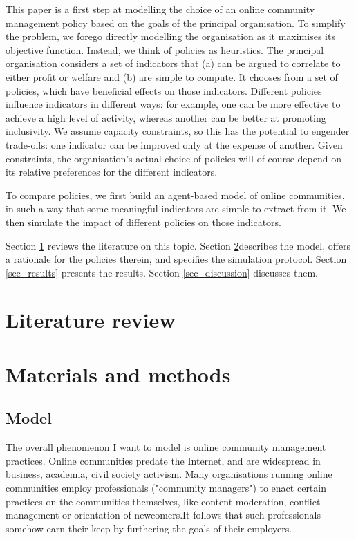 \documentclass{article}
\begin{document}

This paper is a first step at modelling the choice of an online community management policy based on the goals of the principal organisation. To simplify the problem, we forego directly modelling the organisation as it maximises its objective function. Instead, we think of policies as heuristics. The principal organisation considers a set of indicators that (a) can be argued to correlate to either profit or welfare and (b) are simple to compute. It chooses from a set of policies, which have beneficial effects on those indicators. Different policies influence indicators in different ways: for example, one can be more effective to achieve a high level of activity, whereas another can be better at promoting inclusivity. We assume capacity constraints, so this has the potential to engender trade-offs: one indicator can be improved only at the expense of another. Given constraints, the organisation's actual choice of policies will of course depend on its relative preferences for the different indicators. 

To compare policies, we first build an agent-based model of online communities, in such a way that some meaningful indicators are simple to extract from it. We then simulate the impact of different policies on those indicators. 

Section \ref{sec_literature} reviews the literature on this topic. Section \ref{sec_materials}describes the model, offers a rationale for the policies therein, and specifies the simulation protocol. Section \ref{sec_results} presents the results. Section \ref{sec_discussion} discusses them.

\section {Literature review} \label{sec_literature}

\section{Materials and methods}\label{sec_materials}

\subsection{Model}

The overall phenomenon I want to model is online community management practices. Online communities predate the Internet, and are widespread in business, academia, civil society activism. Many organisations running online communities employ professionals ("community managers") to enact certain practices on the communities themselves, like content moderation, conflict management or orientation of newcomers.It follows that such professionals somehow earn their keep by furthering the goals of their employers. 
\end{document}
